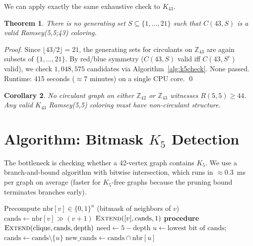 \documentclass[11pt]{article}
\newtheorem{theorem}{Theorem}
\newtheorem{corollary}[theorem]{Corollary}
\begin{document}
We can apply exactly the same exhaustive check to $K_{43}$.

\begin{theorem}\label{thm:k43}
There is no generating set $S \subseteq \{1,\ldots,21\}$ such that
$C(43,S)$ is a valid Ramsey(5,5;43) coloring.
\end{theorem}

\begin{proof}
Since $\lfloor 43/2 \rfloor = 21$, the generating sets for circulants on
$\mathbb{Z}_{43}$ are again subsets of $\{1,\ldots,21\}$.
By red/blue symmetry ($C(43,S)$ valid iff $C(43,S^c)$ valid),
we check $1{,}048{,}575$ candidates via Algorithm~\ref{alg:k5check}.
None passed. Runtime: 415 seconds ($\approx 7$ minutes) on a single CPU core. \qed
\end{proof}

\begin{corollary}
No circulant graph on either $\mathbb{Z}_{42}$ or $\mathbb{Z}_{43}$
witnesses $R(5,5) \geq 44$. Any valid $K_{43}$ Ramsey(5,5) coloring
must have non-circulant structure.
\end{corollary}

\section{Algorithm: Bitmask $K_5$ Detection}

The bottleneck is checking whether a 42-vertex graph contains $K_5$.
We use a branch-and-bound algorithm with bitwise intersection, which
runs in $\approx 0.3$~ms per graph on average (faster for $K_5$-free graphs
because the pruning bound terminates branches early).

\begin{algorithm}
\caption{Bitmask $K_5$ detection in graph $G$ on $n$ vertices}
\label{alg:k5check}
\begin{algorithmic}[1]
\STATE Precompute $\text{nbr}[v] \in \{0,1\}^n$ (bitmask of neighbors of $v$)
  \STATE $\text{cands} \leftarrow \text{nbr}[v] \gg (v+1)$ 
  \STATE $\textsc{Extend}([v], \text{cands}, 1)$
\ENDFOR
\STATE \textbf{procedure} $\textsc{Extend}(\text{clique}, \text{cands}, \text{depth})$
 \RETURN \TRUE \ENDIF
\STATE $\text{need} \leftarrow 5 - \text{depth}$
  \STATE $u \leftarrow \text{lowest bit of cands}$; $\text{cands} \leftarrow \text{cands} \setminus \{u\}$
  \STATE $\text{new\_cands} \leftarrow \text{cands} \cap \text{nbr}[u]$
      \RETURN \TRUE
    \ENDIF
  \ENDIF
\ENDWHILE
\RETURN \FALSE
\end{algorithmic}
\end{algorithm}
\end{document}
